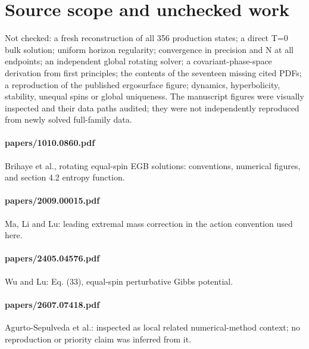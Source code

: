 \documentclass[10pt,a4paper]{article}
\begin{document}
\section{Source scope and unchecked work}Not checked: a fresh reconstruction of all 356 production states; a direct T=0 bulk solution; uniform horizon regularity; convergence in precision and N at all endpoints; an independent global rotating solver; a covariant-phase-space derivation from first principles; the contents of the seventeen missing cited PDFs; a reproduction of the published ergosurface figure; dynamics, hyperbolicity, stability, unequal spins or global uniqueness. The manuscript figures were visually inspected and their data paths audited; they were not independently reproduced from newly solved full-family data.
\paragraph{papers/1010.0860.pdf} Brihaye et al., rotating equal-spin EGB solutions: conventions, numerical figures, and section 4.2 entropy function.
\paragraph{papers/2009.00015.pdf} Ma, Li and Lu: leading extremal mass correction in the action convention used here.
\paragraph{papers/2405.04576.pdf} Wu and Lu: Eq. (33), equal-spin perturbative Gibbs potential.
\paragraph{papers/2607.07418.pdf} Agurto-Sepulveda et al.: inspected as local related numerical-method context; no reproduction or priority claim was inferred from it.
\end{document}
